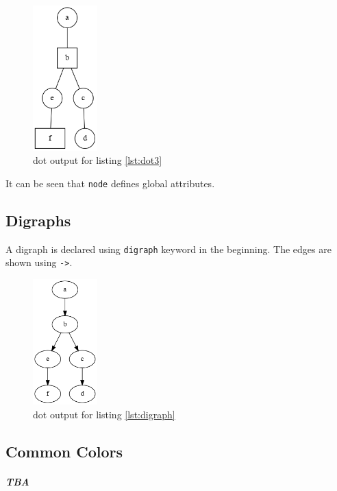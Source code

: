 \documentclass{article}
\begin{document}
	

	\begin{figure}[H]
		\begin{center}
			\includegraphics[width=25mm]{figure3.png}
		\end{center}
		\caption{dot output for listing \ref{lst:dot3} }
		\label{fig:png3}
	\end{figure}

	It can be seen that \lstinline{node} defines global attributes.

	\subsection{Digraphs}
	A digraph is declared using \lstinline{digraph} keyword in the beginning. The edges are shown using \lstinline{->}.

	

	\begin{figure}[H]
		\begin{center}
			\includegraphics[width=25mm]{digraph.png}
		\end{center}
		\caption{dot output for listing \ref{lst:digraph} }
		\label{fig:digraph}
	\end{figure}

	\subsection{Common Colors}
	\subparagraph{TBA}
\end{document}
